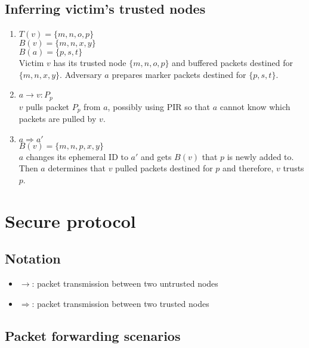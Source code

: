 \documentclass[11pt]{article}
\begin{document}
\subsection{Inferring victim's trusted nodes}
\begin{enumerate}
\item $T(v) = \{m, n, o, p\}$	\\
$B(v) = \{m, n, x, y\}$		\\
$B(a) = \{p, s, t\}$	\\
Victim $v$ has its trusted node $\{m, n, o, p\}$ and buffered packets destined for $\{m, n, x, y\}$.
Adversary $a$ prepares marker packets destined for $\{p, s, t\}$.

\item $a \rightarrow v: P_{p}$	\\
$v$ pulls packet $P_p$ from $a$, possibly using PIR so that $a$ cannot know which packets are pulled by $v$. 


\item $a \Rightarrow a'$	\\
$B(v) = \{m, n, p, x, y\}$	\\
$a$ changes its ephemeral ID to $a'$ and gets $B(v)$ that $p$ is newly added to. 
Then $a$ determines that $v$ pulled packets destined for $p$ and therefore, $v$ trusts $p$. 


\end{enumerate}


\section{Secure protocol}
\subsection{Notation}
\begin{itemize}
\item $\rightarrow$: packet transmission between two untrusted nodes
\item $\Rightarrow$: packet transmission between two trusted nodes
\end{itemize}


\subsection{Packet forwarding scenarios}
\end{document}
